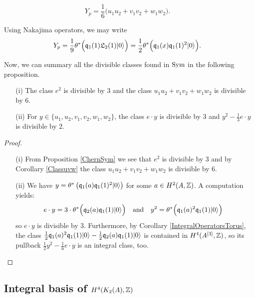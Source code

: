 \begin{corollary}\label{Classuvw}
\begin{equation} \label{YSym}
Y_p =  \frac{1}{6}\Big(u_1u_2 + v_1v_2 +  w_1 w_2 \Big).
\end{equation}
\end{corollary}
\begin{remark}\label{afterClassuvw}
Using Nakajima operators, we may write
\begin{gather}
Y_p = \frac{1}{9} \theta^*\Big( \mathfrak{q}_1(1)\mathfrak L_2(1) |0\rangle \Big) =  \frac{1}{2}\theta^*\Big(\mathfrak{q}_1(x)\mathfrak{q}_1(1)^2|0\rangle\Big).
\end{gather}
\end{remark}
Now, we can summary all the divisible classes found in $\operatorname{Sym}$ in the following proposition. 
\begin{proposition}\label{classedivisibleSym}
\begin{itemize}
\item[(i)]
The class $e^2$ is divisible by $3$ and the class $u_1u_2 + v_1v_2+w_1w_2$ is divisible by 6.
\item[(ii)]
For $y\in\{u_1,u_2,v_1,v_2,w_1,w_2\}$, the class 
$
e \cdot y
$
is divisible by $3$ and 
$
 y^2 - \frac{1}{3} e\cdot y
$
is divisible by $2$.
\end{itemize}
\end{proposition}
\begin{proof}
\begin{itemize}
\item[(i)]
From Proposition \ref{ChernSym} we see that
$e^2$ is divisible by $3$ and by Corollary \ref{Classuvw}
the class $u_1u_2 + v_1v_2+w_1w_2$ is divisible by 6.
\item[(ii)]
We have $y= \theta^*\left(\mathfrak{q}_1(a)\mathfrak{q}_1(1)^2|0\rangle\right)$ for some $a\in H^2(A,\mathbb{Z})$. A computation yields:
$$
e\cdot y = 3\cdot \theta^*\Big( \mathfrak{q}_2(a)\mathfrak{q}_1(1)|0\rangle \Big)
\quad \text{and}\quad
y^2 = \theta^*\Big(\mathfrak{q}_1(a)^2\mathfrak{q}_1(1)|0\rangle\Big)
$$
so $e\cdot y$ is divisible by $3$. Furthermore, by Corollary \ref{IntegralOperatorsTorus}, the class 
$
\frac{1}{2} \mathfrak{q}_1(a)^2\mathfrak{q}_1(1)|0\rangle - \frac{1}{2} \mathfrak{q}_2(a)\mathfrak{q}_1(1)|0\rangle 
$
is contained in $H^4(A^{[3]},\mathbb{Z})$, so its pullback
$
 \frac{1}{2}y^2 - \frac{1}{6} e\cdot y
$
is an integral class, too.
\end{itemize}
\end{proof}
\subsection{Integral basis of $H^4(K_2(A),\mathbb{Z})$}\label{integralbasisH4}

